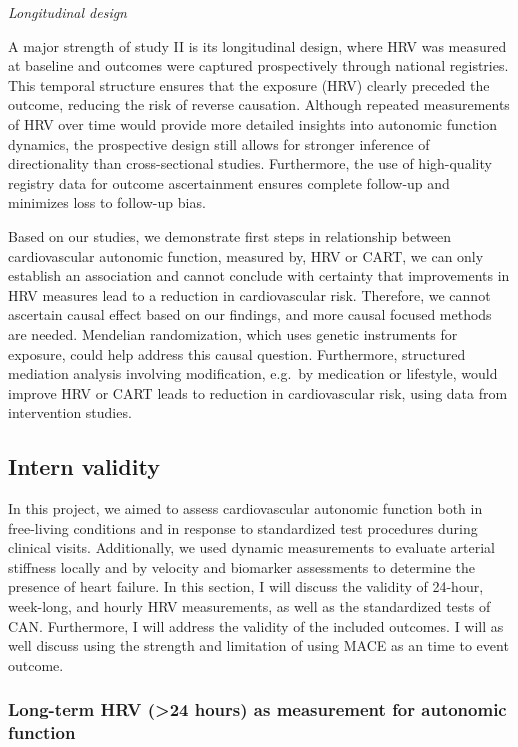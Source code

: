 \documentclass[
  a4paper,
  headsepline=true,
  open=any]{scrbook}
\begin{document}
\emph{Longitudinal design}

A major strength of study II is its longitudinal design, where HRV was
measured at baseline and outcomes were captured prospectively through
national registries. This temporal structure ensures that the exposure
(HRV) clearly preceded the outcome, reducing the risk of reverse
causation. Although repeated measurements of HRV over time would provide
more detailed insights into autonomic function dynamics, the prospective
design still allows for stronger inference of directionality than
cross-sectional studies. Furthermore, the use of high-quality registry
data for outcome ascertainment ensures complete follow-up and minimizes
loss to follow-up bias.

Based on our studies, we demonstrate first steps in relationship between
cardiovascular autonomic function, measured by, HRV or CART, we can only
establish an association and cannot conclude with certainty that
improvements in HRV measures lead to a reduction in cardiovascular risk.
Therefore, we cannot ascertain causal effect based on our findings, and
more causal focused methods are needed. Mendelian randomization, which
uses genetic instruments for exposure, could help address this causal
question. Furthermore, structured mediation analysis involving
modification, e.g.~by medication or lifestyle, would improve HRV or CART
leads to reduction in cardiovascular risk, using data from intervention
studies.

\hypertarget{intern-validity}{%
\subsection{Intern validity}\label{intern-validity}}

In this project, we aimed to assess cardiovascular autonomic function
both in free-living conditions and in response to standardized test
procedures during clinical visits. Additionally, we used dynamic
measurements to evaluate arterial stiffness locally and by velocity and
biomarker assessments to determine the presence of heart failure. In
this section, I will discuss the validity of 24-hour, week-long, and
hourly HRV measurements, as well as the standardized tests of CAN.
Furthermore, I will address the validity of the included outcomes. I
will as well discuss using the strength and limitation of using MACE as
an time to event outcome.

\hypertarget{long-term-hrv-24-hours-as-measurement-for-autonomic-function}{%
\subsubsection{Long-term HRV (\textgreater24 hours) as measurement for
autonomic
function}\label{long-term-hrv-24-hours-as-measurement-for-autonomic-function}}
\end{document}
